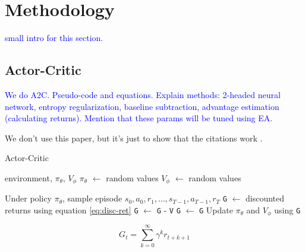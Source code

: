 \documentclass{article}
\newcommand{\TODO}[1]{\textcolor{blue}{#1}}
\begin{document}
\section{Methodology}
\label{sec:meth}

\TODO{small intro for this section.}

\subsection{Actor-Critic}
\label{ssec:ac}

\TODO{
    We do A2C.
    Pseudo-code and equations.
    Explain methods: 2-headed neural network, entropy regularization, baseline subtraction, advantage estimation (calculating returns).
    Mention that these params will be tuned using EA.
}

We don't use this paper, but it's just to show that the citations work \cite{han2020actorcritic}.

\begin{algorithm}[htbp]
    \caption{Actor-Critic}
    \label{alg:trunk}
    \begin{algorithmic}[1]
         environment, $\pi_\theta$, $V_\phi$
        \STATE \texttt{$\pi_\theta$} $\gets$ random values
        \STATE \texttt{$V_\phi$} $\gets$ random values
        
            \STATE Under policy $\pi_\theta$,
            \STATE sample episode $s_0, a_0, r_1, \dots, s_{T-1}, a_{T-1}, r_T$
            \STATE \texttt{G} $\gets$ discounted returns using equation \ref{eq:disc-ret}
                \STATE \texttt{G} $\gets$ \texttt{G} - \texttt{V}
            \ELSE
                \STATE \texttt{G} $\gets$ \texttt{G}
            \ENDIF
            \STATE Update $\pi_\theta$ and $V_\phi$ using \texttt{G}
        \ENDWHILE
    \end{algorithmic}
\end{algorithm}

\begin{equation}
    \label{eq:disc-ret}
    G_t = \sum_{k=0}^{\infty} \gamma^k r_{t+k+1}
\end{equation}

\end{document}
